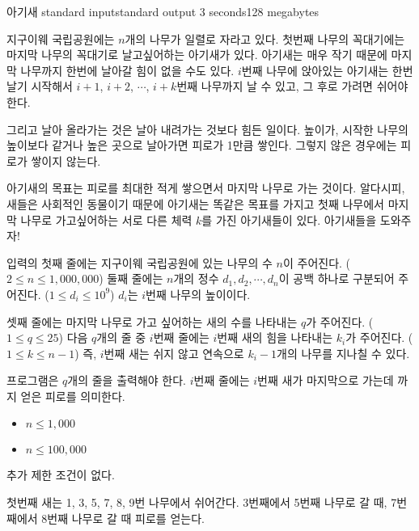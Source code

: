 \begin{problem}{아기새}
	{standard input}{standard output}
	{3 seconds}{128 megabytes}{}
	
	지구이웨 국립공원에는 $n$개의 나무가 일렬로 자라고 있다. 첫번째 나무의 꼭대기에는 마지막 나무의 꼭대기로 날고싶어하는 아기새가 있다. 아기새는 매우 작기 때문에 마지막 나무까지 한번에 날아갈 힘이 없을 수도 있다. $i$번째 나무에 앉아있는 아기새는 한번 날기 시작해서 $i+1$, $i+2$, $\cdots$, $i+k$번째 나무까지 날 수 있고, 그 후로 가려면 쉬어야 한다.
	
	그리고 날아 올라가는 것은 날아 내려가는 것보다 힘든 일이다. 높이가, 시작한 나무의 높이보다 같거나 높은 곳으로 날아가면 피로가 1만큼 쌓인다. 그렇지 않은 경우에는 피로가 쌓이지 않는다.
	
	아기새의 목표는 피로를 최대한 적게 쌓으면서 마지막 나무로 가는 것이다. 알다시피, 새들은 사회적인 동물이기 때문에 아기새는 똑같은 목표를 가지고 첫째 나무에서 마지막 나무로 가고싶어하는 서로 다른 체력 $k$를 가진 아기새들이 있다. 아기새들을 도와주자!
	
	
	\InputFile
	입력의 첫째 줄에는 지구이웨 국립공원에 있는 나무의 수 $n$이 주어진다. ($2 \le n \le 1,000,000$) 둘째 줄에는 $n$개의 정수 $d_1, d_2, \cdots, d_n$이 공백 하나로 구분되어 주어진다. ($1 \le d_i \le 10^9$) $d_i$는 $i$번째 나무의 높이이다.
	
	셋째 줄에는 마지막 나무로 가고 싶어하는 새의 수를 나타내는 $q$가 주어진다. ($1 \le q \le 25$) 다음 $q$개의 줄 중 $i$번째 줄에는 $i$번째 새의 힘을 나타내는 $k_i$가 주어진다. ($1 \le k \le n-1$) 즉, $i$번째 새는 쉬지 않고 연속으로 $k_i - 1$개의 나무를 지나칠 수 있다.
	
	
	\OutputFile
	
	프로그램은 $q$개의 줄을 출력해야 한다. $i$번째 줄에는 $i$번째 새가 마지막으로 가는데 까지 얻은 피로를 의미한다.
	
	\begin{itemize}
		\item $n \le 1,000$
	\end{itemize}
	
	\begin{itemize}
		\item $n \le 100,000$
	\end{itemize}
	
	추가 제한 조건이 없다.
	
	
	
	\Examples
	
	\begin{example}
\end{example}

\Note

첫번째 새는 1, 3, 5, 7, 8, 9번 나무에서 쉬어간다. 3번째에서 5번째 나무로 갈 때, 7번째에서 8번째 나무로 갈 때 피로를 얻는다.

\end{problem}

